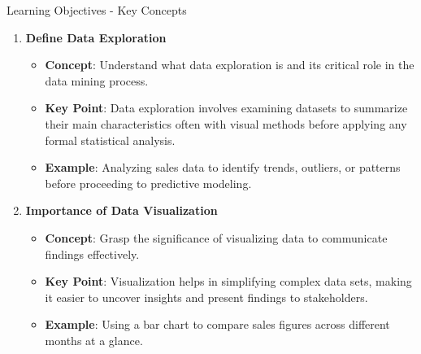 \documentclass[aspectratio=169]{beamer}
\begin{document}
\begin{frame}[fragile]{Learning Objectives - Key Concepts}
    \begin{enumerate}
        \item \textbf{Define Data Exploration}
            \begin{itemize}
                \item \textbf{Concept}: Understand what data exploration is and its critical role in the data mining process.
                \item \textbf{Key Point}: Data exploration involves examining datasets to summarize their main characteristics often with visual methods before applying any formal statistical analysis.
                \item \textbf{Example}: Analyzing sales data to identify trends, outliers, or patterns before proceeding to predictive modeling.
            \end{itemize}
        
        \item \textbf{Importance of Data Visualization}
            \begin{itemize}
                \item \textbf{Concept}: Grasp the significance of visualizing data to communicate findings effectively.
                \item \textbf{Key Point}: Visualization helps in simplifying complex data sets, making it easier to uncover insights and present findings to stakeholders.
                \item \textbf{Example}: Using a bar chart to compare sales figures across different months at a glance.
            \end{itemize}
    \end{enumerate}
\end{frame}
\end{document}
